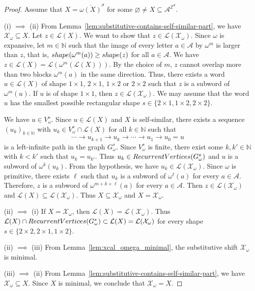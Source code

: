 \documentclass[12pt]{amsart}
\newcommand{\N}{\mathbb{N}}
\newcommand{\Z}{\mathbb{Z}}
\newcommand{\Acal}{\mathcal{A}} %
\newcommand{\Lcal}{\mathcal{L}}
\newcommand{\Xcal}{\mathcal{X}} %
\newcommand{\shape}{\textsc{shape}}
\newcommand{\RecurrentVertices}{\textsc{RecurrentVertices}}
\begin{document}
\begin{proof}
    Assume that $X=\overline{\omega(X)}^{\sigma}$ for some $\varnothing\neq X\subseteq\Acal^{\Z^d}$.

    (i) $\implies$ (ii)
    From Lemma~\ref{lem:substitutive-contains-self-similar-part},
    we have $\Xcal_\omega\subseteq X$.
    Let $z\in\Lcal(X)$. 
    We want to show that $z\in\Lcal(\Xcal_\omega)$. 
    Since $\omega$ is expansive,
    let $m\in\N$ such that the image of every letter
    $a\in\Acal$ by $\omega^m$ is larger than $z$, that is, 
    $\shape(\omega^m(a))\geq\shape(z)$ for all $a\in\Acal$.
    We have $z\in\Lcal(X)=\Lcal\left(\omega^m(\Lcal(X))\right)$.
    By the choice of $m$, $z$ cannot overlap more than two blocks
    $\omega^m(a)$ in the same direction. Thus, there exists a word $u\in\Lcal(X)$ of
    shape 
    $1\times 1$,
    $2\times 1$,
    $1\times 2$ or
    $2\times 2$ such that $z$ is a subword of $\omega^m(u)$.
    If $u$ is of shape $1\times 1$, then $z\in\Lcal(\Xcal_\omega)$.
    We may assume that the word $u$ has the smallest possible rectangular shape
    $s\in \{2\times 1, 1\times 2, 2\times 2\}$.

    We have $u\in V_\omega^{s}$. Since $u\in\Lcal(X)$ and $X$ is self-similar,
    there exists a sequence $(u_k)_{k\in\N}$ with $u_k\in V_\omega^{s}\cap\Lcal(X)$ 
    for all $k\in\N$
    such that
    \[
        \cdots\rightarrow
        u_{k+1} \rightarrow 
        u_k \rightarrow 
        \cdots\rightarrow
        u_1 \rightarrow u_0 = u
    \]
    is a left-infinite path in the graph $G_\omega^{s}$.
    Since $V_\omega^{s}$ is finite, there exist some $k,k'\in\N$ with $k<k'$
    such that $u_k=u_{k'}$.
    Thus $u_k\in\RecurrentVertices(G^s_\omega)$
    and $u$ is a subword of $\omega^k(u_k)$.
    From the hypothesis, we have $u_k\in\Lcal(\Xcal_\omega)$.
    Since $\omega$ is primitive, there exists $\ell$ such that 
    $u_k$ is a subword of $\omega^\ell(a)$ for every $a\in\Acal$.
    Therefore, $z$ is a subword of $\omega^{m+k+\ell}(a)$ for every $a\in\Acal$.
    Then $z\in\Lcal(\Xcal_\omega)$ and $\Lcal(X)\subseteq\Lcal(\Xcal_\omega)$.
    Thus $X\subseteq\Xcal_\omega$ and $X=\Xcal_\omega$.

    (ii) $\implies$ (i)
    If $X=\Xcal_\omega$,
    then $\Lcal(X)=\Lcal(\Xcal_\omega)$.
    Thus $\Lcal(X)\cap\RecurrentVertices(G^s_\omega)\subset\Lcal(X)=\Lcal(\Xcal_\omega)$
    for every shape $s\in\{2\times2, 2\times1, 1\times2\}$.

    (ii) $\implies$ (iii)
    From Lemma~\ref{lem:xcal_omega_minimal}, the substitutive shift
    $\Xcal_\omega$ is minimal.

    (iii) $\implies$ (ii)
    From Lemma~\ref{lem:substitutive-contains-self-similar-part},
    we have $\Xcal_\omega\subseteq X$.
    Since $X$ is minimal, we conclude that $\Xcal_\omega=X$.
\end{proof}
\end{document}
